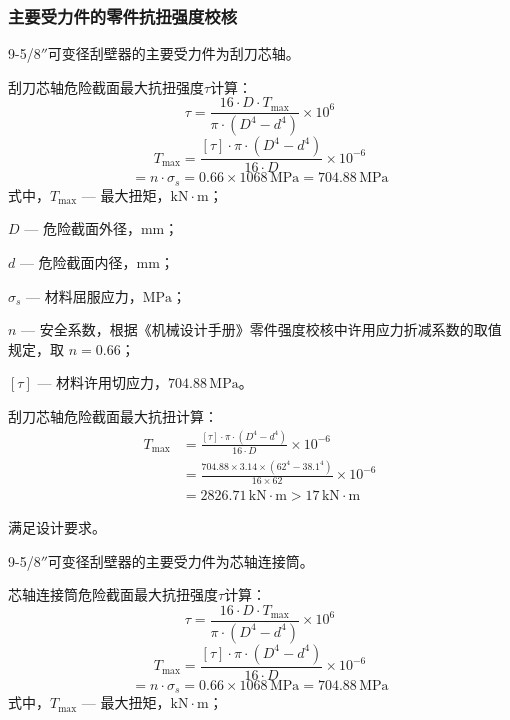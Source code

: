 \subsubsection{主要受力件的零件抗扭强度校核}
9-5/8$''$可变径刮壁器的主要受力件为刮刀芯轴。

刮刀芯轴危险截面最大抗扭强度$\tau$计算：
\begin{equation*}
    \tau = \frac{16 \cdot D \cdot T_{\max}}{\pi \cdot (D^4 - d^4)} \times 10^6
\end{equation*}
\begin{equation*}
    T_{\max} = \frac{[\tau] \cdot \pi \cdot (D^4 - d^4)}{16 \cdot D} \times 10^{-6}
\end{equation*}
\begin{equation*}
    [\tau] = n \cdot \sigma_s = 0.66 \times 1068\,\mathrm{MPa} = 704.88\,\mathrm{MPa}
\end{equation*}
式中，$T_{\max}$ — 最大扭矩，$\mathrm{kN}\cdot\mathrm{m}$；

$D$ — 危险截面外径，$\mathrm{mm}$；

$d$ — 危险截面内径，$\mathrm{mm}$；

$\sigma_s$ — 材料屈服应力，$\mathrm{MPa}$；

$n$ — 安全系数，根据《机械设计手册》零件强度校核中许用应力折减系数的取值规定\cite{ref26}，取 $n = 0.66$；

$[\tau]$ — 材料许用切应力，$704.88\,\mathrm{MPa}$。

刮刀芯轴危险截面最大抗扭计算：
\begin{align}
    T_{\max} &= \frac{[\tau] \cdot \pi \cdot (D^4 - d^4)}{16 \cdot D} \times 10^{-6} \nonumber \\
             &= \frac{704.88 \times 3.14 \times (62^4 - 38.1^4)}{16 \times 62} \times 10^{-6} \nonumber \\
             &= 2826.71\,\mathrm{kN}\cdot\mathrm{m} > 17\,\mathrm{kN}\cdot\mathrm{m}
\end{align}

满足设计要求。

9-5/8$''$可变径刮壁器的主要受力件为芯轴连接筒。

芯轴连接筒危险截面最大抗扭强度$\tau$计算：
\begin{equation}
    \tau = \frac{16 \cdot D \cdot T_{\max}}{\pi \cdot (D^4 - d^4)} \times 10^6
\end{equation}
\begin{equation}
    T_{\max} = \frac{[\tau] \cdot \pi \cdot (D^4 - d^4)}{16 \cdot D} \times 10^{-6}
\end{equation}
\begin{equation}
    [\tau] = n \cdot \sigma_s = 0.66 \times 1068\,\mathrm{MPa} = 704.88\,\mathrm{MPa}
\end{equation}
式中，$T_{\max}$ — 最大扭矩，$\mathrm{kN}\cdot\mathrm{m}$；

